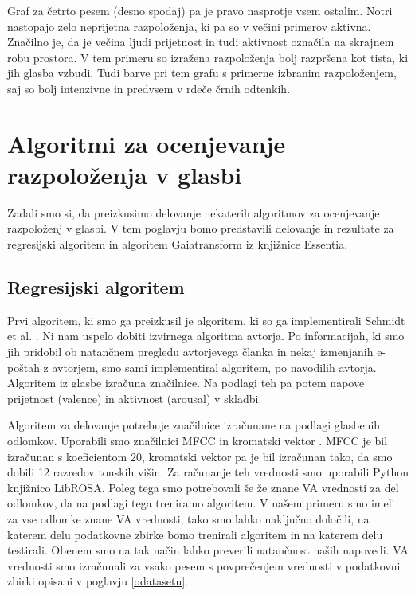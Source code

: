 \documentclass[a4paper, 12pt]{book}
\begin{document}
{Graf za četrto pesem (desno spodaj) pa je pravo nasprotje vsem ostalim. Notri nastopajo zelo neprijetna razpoloženja, ki pa so v večini primerov aktivna. Značilno je, da je večina ljudi prijetnost in tudi aktivnost označila na skrajnem robu prostora. V tem primeru so izražena razpoloženja bolj razpršena kot tista, ki jih glasba vzbudi. Tudi barve pri tem grafu s primerne izbranim razpoloženjem, saj so bolj intenzivne in predvsem v rdeče črnih odtenkih. 

\chapter{Algoritmi za ocenjevanje razpoloženja v glasbi}

Zadali smo si, da preizkusimo delovanje nekaterih algoritmov za ocenjevanje razpoloženj v glasbi. V tem poglavju bomo predstavili delovanje in rezultate za regresijski algoritem in algoritem Gaiatransform iz knjižnice Essentia.

\section{Regresijski algoritem}
\label{regresijsialg}

Prvi algoritem, ki smo ga preizkusil je algoritem, ki so ga implementirali Schmidt et al. \cite{schmidt2009projection}. Ni nam uspelo dobiti izvirnega algoritma avtorja. Po informacijah, ki smo jih pridobil ob natančnem pregledu avtorjevega članka in nekaj izmenjanih e-poštah z avtorjem, smo sami implementiral algoritem, po navodilih avtorja. Algoritem iz glasbe izračuna značilnice. Na podlagi teh pa potem napove prijetnost (valence) in aktivnost (arousal) v skladbi. 

Algoritem za delovanje potrebuje značilnice izračunane na podlagi glasbenih odlomkov. Uporabili smo značilnici MFCC \cite{logan2000mel} in kromatski vektor \cite{Bello2005}. MFCC je bil izračunan s koeficientom 20, kromatski vektor pa je bil izračunan tako, da smo dobili 12 razredov tonskih višin. Za računanje teh vrednosti smo uporabili Python knjižnico LibROSA. Poleg tega smo potrebovali še že znane VA vrednosti za del odlomkov, da na podlagi tega treniramo algoritem. V našem primeru smo imeli za vse odlomke znane VA vrednosti, tako smo lahko naključno določili, na katerem delu podatkovne zbirke bomo trenirali algoritem in na katerem delu testirali. Obenem smo na tak način lahko preverili natančnost naših napovedi. VA vrednosti smo izračunali za vsako pesem s povprečenjem vrednosti v podatkovni zbirki opisani v poglavju \ref{odatasetu}.

}
\end{document}
